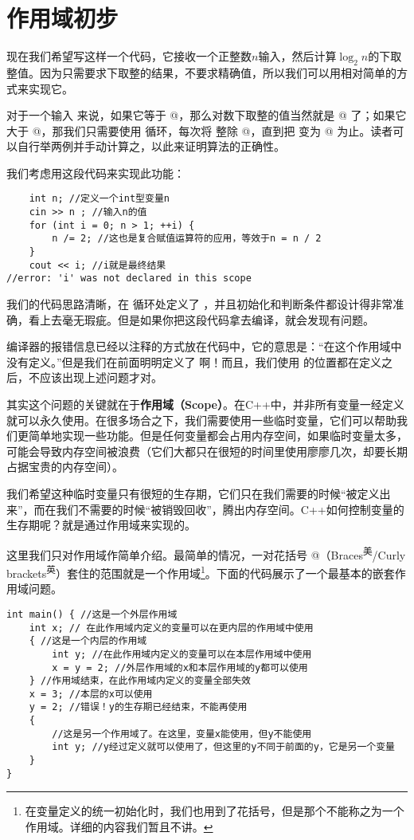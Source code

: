 \section{作用域初步}
现在我们希望写这样一个代码，它接收一个正整数$n$输入，然后计算$\log_2n$的下取整值。因为只需要求下取整的结果，不要求精确值，所以我们可以用相对简单的方式来实现它。\par
对于一个输入 \lstinline@n@ 来说，如果它等于 @，那么对数下取整的值当然就是 @ 了；如果它大于 @，那我们只需要使用 \lstinline@for@ 循环，每次将 \lstinline@n@ 整除 @，直到把 \lstinline@n@ 变为 @ 为止。读者可以自行举两例并手动计算之，以此来证明算法的正确性。\par
我们考虑用这段代码来实现此功能：
\begin{lstlisting}
    int n; //定义一个int型变量n
    cin >> n ; //输入n的值
    for (int i = 0; n > 1; ++i) {
        n /= 2; //这也是复合赋值运算符的应用，等效于n = n / 2
    }
    cout << i; //i就是最终结果
//error: 'i' was not declared in this scope
\end{lstlisting}
我们的代码思路清晰，在 \lstinline@for@ 循环处定义了 \lstinline@i@，并且初始化和判断条件都设计得非常准确，看上去毫无瑕疵。但是如果你把这段代码拿去编译，就会发现有问题。\par
编译器的报错信息已经以注释的方式放在代码中，它的意思是：``\lstinline@i@ 在这个作用域中没有定义。''但是我们在前面明明定义了 \lstinline@i@ 啊！而且，我们使用 \lstinline@i@ 的位置都在定义之后，不应该出现上述问题才对。\par
其实这个问题的关键就在于\textbf{作用域（Scope）}。在C++中，并非所有变量一经定义就可以永久使用。在很多场合之下，我们需要使用一些临时变量，它们可以帮助我们更简单地实现一些功能。但是任何变量都会占用内存空间，如果临时变量太多，可能会导致内存空间被浪费（它们大都只在很短的时间里使用廖廖几次，却要长期占据宝贵的内存空间）。\par
我们希望这种临时变量只有很短的生存期，它们只在我们需要的时候``被定义出来''，而在我们不需要的时候``被销毁回收''，腾出内存空间。C++如何控制变量的生存期呢？就是通过作用域来实现的。\par
这里我们只对作用域作简单介绍。最简单的情况，一对花括号 \lstinline@{}@（Braces\textsuperscript{美}/Curly brackets\textsuperscript{英}）套住的范围就是一个作用域\footnote{在变量定义的统一初始化时，我们也用到了花括号，但是那个不能称之为一个作用域。详细的内容我们暂且不讲。}。下面的代码展示了一个最基本的嵌套作用域问题。
\begin{lstlisting}
int main() { //这是一个外层作用域
    int x; // 在此作用域内定义的变量可以在更内层的作用域中使用
    { //这是一个内层的作用域
        int y; //在此作用域内定义的变量可以在本层作用域中使用
        x = y = 2; //外层作用域的x和本层作用域的y都可以使用
    } //作用域结束，在此作用域内定义的变量全部失效
    x = 3; //本层的x可以使用
    y = 2; //错误！y的生存期已经结束，不能再使用
    {
        //这是另一个作用域了。在这里，变量x能使用，但y不能使用
        int y; //y经过定义就可以使用了，但这里的y不同于前面的y，它是另一个变量
    }
}
\end{lstlisting}\par
